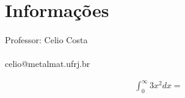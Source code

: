 \documentclass[a4paper]{article}
\begin{document}
  \section*{Informações}
  \paragraph*{ } Professor: Celio Costa
  \paragraph*{ } celio@metalmat.ufrj.br

  \begin{gather}
    \int_{0}^{\infty} 3x^2 dx =  
  \end{gather}
\end{document}
